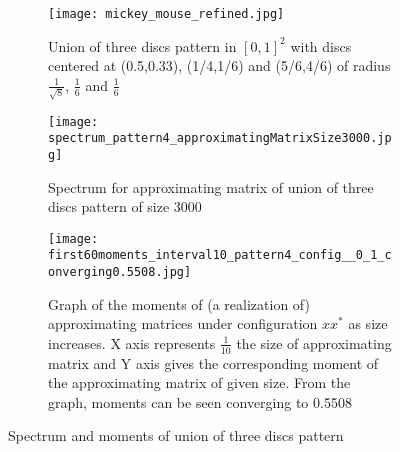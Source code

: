 \documentclass[12pt]{amsart}
\theoremstyle{definition}
\theoremstyle{remark}
\begin{document}
\begin{figure}
\begin{subfigure}[b]{0.45\textwidth}
  \centering
  \texttt{[image: mickey\_mouse\_refined.jpg]}
  \caption{Union of three discs pattern in $[0,1]^2$ with discs centered at (0.5,0.33), (1/4,1/6) and (5/6,4/6) of radius $\frac{1}{\sqrt{8}}$, $\frac{1}{6}$ and $\frac{1}{6}$}
  \label{fig:sfig1}
\end{subfigure}
\hfill
\begin{subfigure}[b]{.45\textwidth}
  \centering
  \texttt{[image: spectrum\_pattern4\_approximatingMatrixSize3000.jpg]}
  \caption{Spectrum for approximating matrix of union of three discs pattern of size 3000}
  \label{fig:sfig2}
\end{subfigure}
\begin{subfigure}{1\textwidth}
  \centering
  \texttt{[image: first60moments\_interval10\_pattern4\_config\_\_0\_1\_converging0.5508.jpg]}
  \caption{Graph of the moments of (a realization of) approximating matrices under configuration $xx^*$ as size increases. X axis represents $\frac{1}{10}$ the size of approximating matrix and Y axis gives the corresponding moment of the approximating matrix of given size. From the graph, moments can be seen converging to 0.5508}
  \label{fig:sfig3}
\end{subfigure}

\caption{Spectrum and moments of union of three discs pattern}
\label{fig:fig}
\end{figure}
\end{document}
